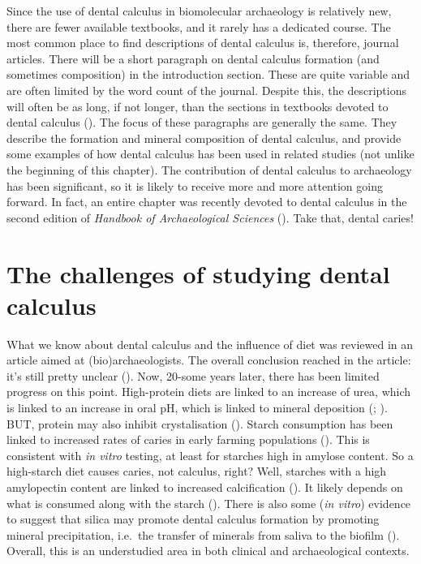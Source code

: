 \documentclass[
  b5paper,
]{book}
\begin{document}
Since the use of dental calculus in biomolecular archaeology is
relatively new, there are fewer available textbooks, and it rarely has a
dedicated course. The most common place to find descriptions of dental
calculus is, therefore, journal articles. There will be a short
paragraph on dental calculus formation (and sometimes composition) in
the introduction section. These are quite variable and are often limited
by the word count of the journal. Despite this, the descriptions will
often be as long, if not longer, than the sections in textbooks devoted
to dental calculus (). The focus of these paragraphs are generally the same.
They describe the formation and mineral composition of dental calculus,
and provide some examples of how dental calculus has been used in
related studies (not unlike the beginning of this chapter). The
contribution of dental calculus to archaeology has been significant, so
it is likely to receive more and more attention going forward. In fact,
an entire chapter was recently devoted to dental calculus in the second
edition of \emph{Handbook of Archaeological Sciences}
().
Take that, dental caries!

\section{The challenges of studying dental
calculus}\label{the-challenges-of-studying-dental-calculus}

What we know about dental calculus and the influence of diet was
reviewed in an article aimed at (bio)archaeologists. The overall
conclusion reached in the article: it's still pretty unclear
(). Now, 20-some
years later, there has been limited progress on this point. High-protein
diets are linked to an increase of urea, which is linked to an increase
in oral pH, which is linked to mineral deposition
(;
). BUT,
protein may also inhibit crystalisation
().
Starch consumption has been linked to increased rates of caries in early
farming populations
(). This is
consistent with \emph{in vitro} testing, at least for starches high in
amylose content. So a high-starch diet causes caries, not calculus,
right? Well, starches with a high amylopectin content are linked to
increased calcification (). It likely depends on what is consumed along with the
starch (). There is also some (\emph{in vitro}) evidence to suggest that
silica may promote dental calculus formation by promoting mineral
precipitation, i.e.~the transfer of minerals from saliva to the biofilm
(). Overall,
this is an understudied area in both clinical and archaeological
contexts.
\end{document}

